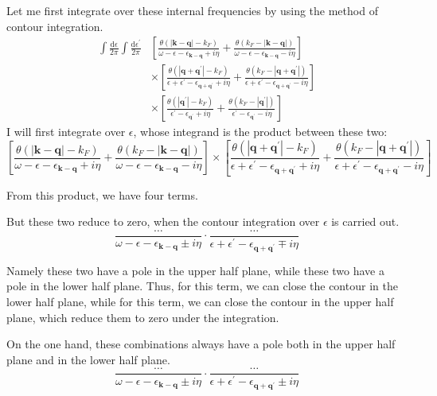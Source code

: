 Let me first integrate over these internal frequencies by using the method of contour integration.
\[ \begin{split} \int \frac{\mathrm{d}\epsilon}{2\pi} \int \frac{\mathrm{d}\epsilon^{'}}{2\pi}
&\left[ \frac{\theta(|\mathbf{k}-\mathbf{q}|-k_F)}{\omega - \epsilon - \epsilon_{\mathbf{k}-\mathbf{q}}+i \eta} + \frac{\theta(k_F-|\mathbf{k}-\mathbf{q}|)}{\omega - \epsilon - \epsilon_{\mathbf{k}-\mathbf{q}}-i \eta} \right] \\
& \times \left[ \frac{\theta(|\mathbf{q}+\mathbf{q}^{'}|-k_F)}{\epsilon + \epsilon^{'} - \epsilon_{\mathbf{q}+\mathbf{q}^{'}}+i \eta} + \frac{ \theta(k_F-|\mathbf{q}+\mathbf{q}^{'}|)}{\epsilon + \epsilon^{'} - \epsilon_{\mathbf{q}+\mathbf{q}^{'}}-i \eta} \right] \\
& \times \left[ \frac{\theta(|\mathbf{q}^{'}|-k_F)}{\epsilon^{'} - \epsilon_{\mathbf{q}^{'}}+i \eta} + \frac{\theta(k_F-|\mathbf{q}^{'}|)}{\epsilon^{'} - \epsilon_{\mathbf{q}^{'}}-i \eta} \right]
\end{split} \]
I will first integrate over $\epsilon$, whose integrand is the product between these two:
\[\left[ \frac{\theta(|\mathbf{k}-\mathbf{q}|-k_F)}{\omega - \epsilon - \epsilon_{\mathbf{k}-\mathbf{q}}+i \eta} + \frac{\theta(k_F-|\mathbf{k}-\mathbf{q}|)}{\omega - \epsilon - \epsilon_{\mathbf{k}-\mathbf{q}}-i \eta} \right]
\times \left[ \frac{\theta(|\mathbf{q}+\mathbf{q}^{'}|-k_F)}{\epsilon + \epsilon^{'} - \epsilon_{\mathbf{q}+\mathbf{q}^{'}}+i \eta} + \frac{ \theta(k_F-|\mathbf{q}+\mathbf{q}^{'}|)}{\epsilon + \epsilon^{'} - \epsilon_{\mathbf{q}+\mathbf{q}^{'}}-i \eta} \right] \]

From this product, we have four terms.

But these two reduce to zero, when the contour integration over $\epsilon$ is carried out.
\[ \frac{\ldots}{\omega - \epsilon - \epsilon_{\mathbf{k}-\mathbf{q}} \pm i \eta} \cdot \frac{ \ldots}{\epsilon + \epsilon^{'} - \epsilon_{\mathbf{q}+\mathbf{q}^{'}} \mp i \eta} \]

Namely these two have a pole in the upper half plane, while these two have a pole in the lower half plane. Thus, for this term, we can close the contour in the lower half plane, while for this term, we can close the contour in the upper half plane, which reduce them to zero under the integration.

On the one hand, these combinations always have a pole both in the upper half plane and in the lower half plane.
\[ \frac{\ldots}{\omega - \epsilon - \epsilon_{\mathbf{k}-\mathbf{q}} \pm i \eta} \cdot \frac{ \ldots}{\epsilon + \epsilon^{'} - \epsilon_{\mathbf{q}+\mathbf{q}^{'}} \pm i \eta} \]

